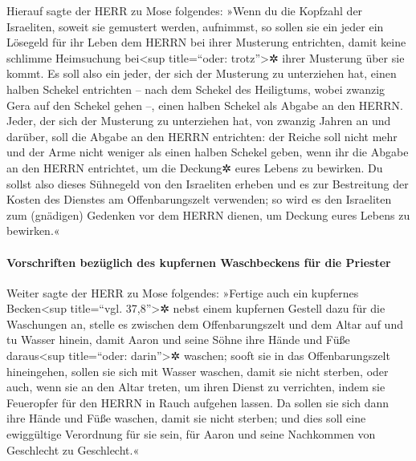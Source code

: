  Hierauf sagte der HERR zu Mose folgendes:
 »Wenn du die Kopfzahl der Israeliten, soweit sie
gemustert werden, aufnimmst, so sollen sie ein jeder ein Lösegeld für
ihr Leben dem HERRN bei ihrer Musterung entrichten, damit keine schlimme
Heimsuchung bei\textless sup title=``oder: trotz''\textgreater✲ ihrer
Musterung über sie kommt.  Es soll also ein jeder, der
sich der Musterung zu unterziehen hat, einen halben Schekel entrichten
-- nach dem Schekel des Heiligtums, wobei zwanzig Gera auf den Schekel
gehen --, einen halben Schekel als Abgabe an den HERRN. 
Jeder, der sich der Musterung zu unterziehen hat, von zwanzig Jahren an
und darüber, soll die Abgabe an den HERRN entrichten: 
der Reiche soll nicht mehr und der Arme nicht weniger als einen halben
Schekel geben, wenn ihr die Abgabe an den HERRN entrichtet, um die
Deckung✲ eures Lebens zu bewirken.  Du sollst also dieses
Sühnegeld von den Israeliten erheben und es zur Bestreitung der Kosten
des Dienstes am Offenbarungszelt verwenden; so wird es den Israeliten
zum (gnädigen) Gedenken vor dem HERRN dienen, um Deckung eures Lebens zu
bewirken.«

\hypertarget{vorschriften-bezuxfcglich-des-kupfernen-waschbeckens-fuxfcr-die-priester}{%
\paragraph{Vorschriften bezüglich des kupfernen Waschbeckens für die
Priester}\label{vorschriften-bezuxfcglich-des-kupfernen-waschbeckens-fuxfcr-die-priester}}

 Weiter sagte der HERR zu Mose folgendes: 
»Fertige auch ein kupfernes Becken\textless sup title=``vgl.
37,8''\textgreater✲ nebst einem kupfernen Gestell dazu für die
Waschungen an, stelle es zwischen dem Offenbarungszelt und dem Altar auf
und tu Wasser hinein,  damit Aaron und seine Söhne ihre
Hände und Füße daraus\textless sup title=``oder: darin''\textgreater✲
waschen;  sooft sie in das Offenbarungszelt hineingehen,
sollen sie sich mit Wasser waschen, damit sie nicht sterben, oder auch,
wenn sie an den Altar treten, um ihren Dienst zu verrichten, indem sie
Feueropfer für den HERRN in Rauch aufgehen lassen.  Da
sollen sie sich dann ihre Hände und Füße waschen, damit sie nicht
sterben; und dies soll eine ewiggültige Verordnung für sie sein, für
Aaron und seine Nachkommen von Geschlecht zu Geschlecht.«

